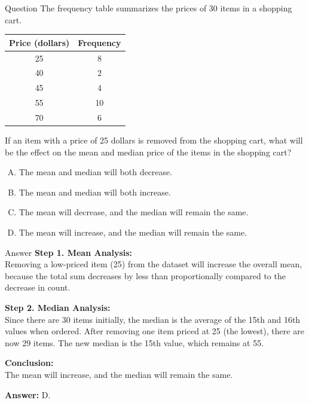 \documentclass{beamer}
\begin{document}
\begin{frame}{Question}
The frequency table summarizes the prices of 30 items in a shopping cart.

\begin{center}
\begin{tabular}{|c|c|}
\hline
\textbf{Price (dollars)} & \textbf{Frequency} \\
\hline
25 & 8 \\
40 & 2 \\
45 & 4 \\
55 & 10 \\
70 & 6 \\
\hline
\end{tabular}
\end{center}

If an item with a price of 25 dollars is removed from the shopping cart, what will be the effect on the mean and median price of the items in the shopping cart?

\begin{enumerate}[A.]
    \item The mean and median will both decrease.
    \item The mean and median will both increase.
    \item The mean will decrease, and the median will remain the same.
    \item The mean will increase, and the median will remain the same.
\end{enumerate}
\end{frame}


\begin{frame}{Answer}
\textbf{Step 1. Mean Analysis:} \\
Removing a low-priced item (25) from the dataset will increase the overall mean, because the total sum decreases by less than proportionally compared to the decrease in count.

\textbf{Step 2. Median Analysis:} \\
Since there are 30 items initially, the median is the average of the 15th and 16th values when ordered. After removing one item priced at 25 (the lowest), there are now 29 items. The new median is the 15th value, which remains at 55.

\textbf{Conclusion:} \\
The mean will increase, and the median will remain the same.

\textbf{Answer:} D.
\end{frame}
\end{document}
